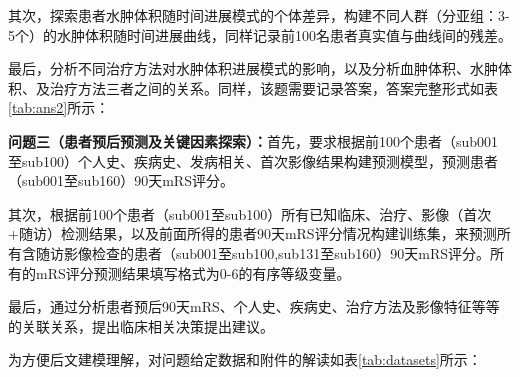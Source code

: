 \documentclass[bwprint]{gmcmthesis}
\begin{document}
			其次，探索患者水肿体积随时间进展模式的个体差异，构建不同人群（分亚组：3-5个）的水肿体积随时间进展曲线，同样记录前100名患者真实值与曲线间的残差。
			
			最后，分析不同治疗方法对水肿体积进展模式的影响，以及分析血肿体积、水肿体积、及治疗方法三者之间的关系。同样，该题需要记录答案，答案完整形式如表\ref{tab:ans2}所示：
			
			\begin{table}[H]
				\caption{问题二答案样式}
				\label{tab:ans2}
			\end{table}
			
			
			\textbf{问题三（患者预后预测及关键因素探索）：}首先，要求根据前100个患者（sub001至sub100）个人史、疾病史、发病相关、首次影像结果构建预测模型，预测患者（sub001至sub160）90天mRS评分。
			
			其次，根据前100个患者（sub001至sub100）所有已知临床、治疗、影像（首次+随访）检测结果，以及前面所得的患者90天mRS评分情况构建训练集，来预测所有含随访影像检查的患者（sub001至sub100,sub131至sub160）90天mRS评分。所有的mRS评分预测结果填写格式为0-6的有序等级变量。
			
			最后，通过分析患者预后90天mRS、个人史、疾病史、治疗方法及影像特征等等的关联关系，提出临床相关决策提出建议。
			
			
			为方便后文建模理解，对问题给定数据和附件的解读如表\ref{tab:datasets}所示：
			
			\begin{table}[H]
				\caption{给定附件解释}
				\label{tab:datasets}
			\end{table}
		
\end{document}
